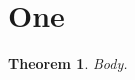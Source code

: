 \documentclass{article}
\newtheorem{theorem}{Theorem}[\relax]
\begin{document}
\section{One}
\begin{theorem}Body.\end{theorem}
\end{document}
